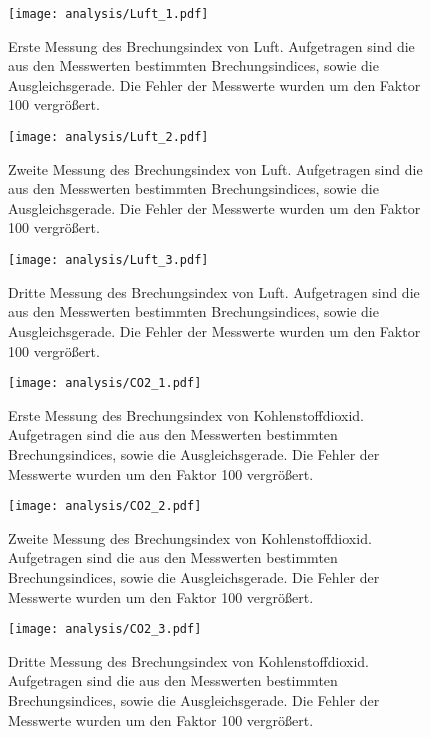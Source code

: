\begin{figure}[htb]
  \centering
  \texttt{[image: analysis/Luft\_1.pdf]}
  \caption{Erste Messung des Brechungsindex von Luft. Aufgetragen sind die aus
  den Messwerten bestimmten Brechungsindices, sowie die Ausgleichsgerade. Die
  Fehler der Messwerte wurden um den Faktor 100 vergrößert.}
  \label{fig:luft1}
\end{figure}

\begin{figure}
  \centering
  \texttt{[image: analysis/Luft\_2.pdf]}
  \caption{Zweite Messung des Brechungsindex von Luft. Aufgetragen sind die aus
  den Messwerten bestimmten Brechungsindices, sowie die Ausgleichsgerade. Die
  Fehler der Messwerte wurden um den Faktor 100 vergrößert.}
  \label{fig:luft2}
\end{figure}

\begin{figure}
  \centering
  \texttt{[image: analysis/Luft\_3.pdf]}
  \caption{Dritte Messung des Brechungsindex von Luft. Aufgetragen sind die aus
  den Messwerten bestimmten Brechungsindices, sowie die Ausgleichsgerade. Die
  Fehler der Messwerte wurden um den Faktor 100 vergrößert.}
  \label{fig:luft3}
\end{figure}%

\begin{figure}
  \centering
  \texttt{[image: analysis/CO2\_1.pdf]}
  \caption{Erste Messung des Brechungsindex von Kohlenstoffdioxid. Aufgetragen
  sind die aus den Messwerten bestimmten Brechungsindices, sowie die
  Ausgleichsgerade. Die Fehler der Messwerte wurden um den Faktor 100
  vergrößert.}
  \label{fig:co2_1}
\end{figure}

\begin{figure}
  \centering
  \texttt{[image: analysis/CO2\_2.pdf]}
  \caption{Zweite Messung des Brechungsindex von Kohlenstoffdioxid. Aufgetragen
  sind die aus den Messwerten bestimmten Brechungsindices, sowie die
  Ausgleichsgerade. Die Fehler der Messwerte wurden um den Faktor 100
  vergrößert.}
  \label{fig:co2_2}
\end{figure}

\begin{figure}
  \centering
  \texttt{[image: analysis/CO2\_3.pdf]}
  \caption{Dritte Messung des Brechungsindex von Kohlenstoffdioxid. Aufgetragen
  sind die aus den Messwerten bestimmten Brechungsindices, sowie die
  Ausgleichsgerade. Die Fehler der Messwerte wurden um den Faktor 100
  vergrößert.}
  \label{fig:co2_3}
\end{figure}
